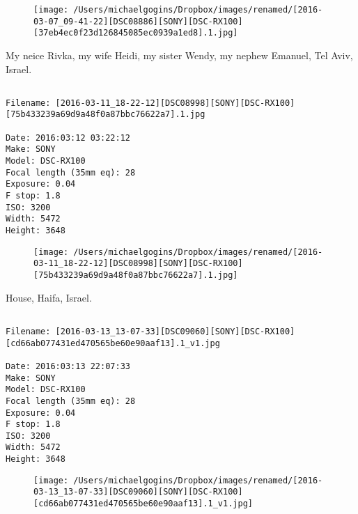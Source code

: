 \begin{figure}
\texttt{[image: /Users/michaelgogins/Dropbox/images/renamed/[2016-03-07\_09-41-22][DSC08886][SONY][DSC-RX100][37eb4ec0f23d126845085ec0939a1ed8].1.jpg]}
\end{figure}
    
\clearpage
\onecolumn
\noindent My neice Rivka, my wife Heidi, my sister Wendy, my nephew Emanuel, Tel Aviv, Israel.
\noindent
\begin{lstlisting}

Filename: [2016-03-11_18-22-12][DSC08998][SONY][DSC-RX100][75b433239a69d9a48f0a87bbc76622a7].1.jpg

Date: 2016:03:12 03:22:12
Make: SONY
Model: DSC-RX100
Focal length (35mm eq): 28
Exposure: 0.04
F stop: 1.8
ISO: 3200
Width: 5472
Height: 3648
\end{lstlisting}
\clearpage

\begin{figure}
\texttt{[image: /Users/michaelgogins/Dropbox/images/renamed/[2016-03-11\_18-22-12][DSC08998][SONY][DSC-RX100][75b433239a69d9a48f0a87bbc76622a7].1.jpg]}
\end{figure}
    
\clearpage
\onecolumn
\noindent House, Haifa, Israel.
\noindent
\begin{lstlisting}

Filename: [2016-03-13_13-07-33][DSC09060][SONY][DSC-RX100][cd66ab077431ed470565be60e90aaf13].1_v1.jpg

Date: 2016:03:13 22:07:33
Make: SONY
Model: DSC-RX100
Focal length (35mm eq): 28
Exposure: 0.04
F stop: 1.8
ISO: 3200
Width: 5472
Height: 3648
\end{lstlisting}
\clearpage

\begin{figure}
\texttt{[image: /Users/michaelgogins/Dropbox/images/renamed/[2016-03-13\_13-07-33][DSC09060][SONY][DSC-RX100][cd66ab077431ed470565be60e90aaf13].1\_v1.jpg]}
\end{figure}
    
